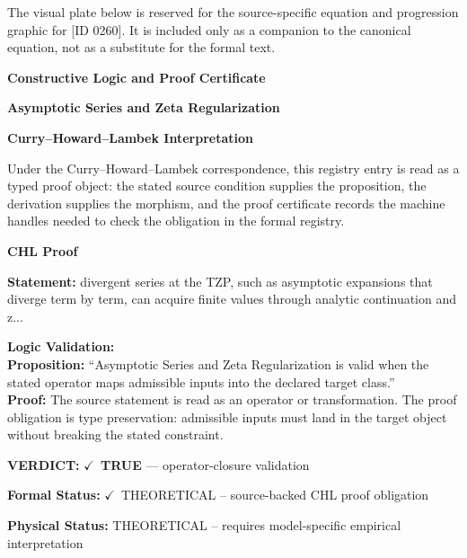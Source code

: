 \begingroup\footnotesize\sloppy
The visual plate below is reserved for the source-specific equation and progression graphic for [ID 0260]. It is included only as a companion to the canonical equation, not as a substitute for the formal text.
\par\endgroup
\ifTZPDarkEdition
{}
\fi

\clearpage
\begingroup\tzpsupportsetup
\noindent\textbf{\fontsize{10.8pt}{12.8pt}\selectfont [ID 0260] Constructive Logic and Proof Certificate}\par
\noindent\textbf{\fontsize{10pt}{12pt}\selectfont Asymptotic Series and Zeta Regularization}\par
\vspace{0.45em}
\begingroup
\footnotesize
\setlength{\parskip}{0.22em}
\setlength{\parindent}{0pt}
\noindent\textbf{Curry--Howard--Lambek Interpretation}\par
Under the Curry--Howard--Lambek correspondence, this registry entry is read as a typed proof
object: the stated source condition supplies the proposition, the derivation supplies the
morphism, and the proof certificate records the machine handles needed to check the obligation
in the formal registry.

\vspace{0.45em}
\noindent\textbf{CHL Proof}\par
\textbf{Statement:} divergent series at the TZP, such as asymptotic expansions that diverge term by term,
can acquire finite values through analytic continuation and z...

\textbf{Logic Validation:}\\
\textbf{Proposition:} ``Asymptotic Series and Zeta Regularization is valid when the stated operator maps
admissible inputs into the declared target class.''\\
\textbf{Proof:} The source statement is read as an operator or transformation. The proof obligation is
type preservation: admissible inputs must land in the target object without breaking the
stated constraint.

\textbf{VERDICT:} \ensuremath{\checkmark}\ \textbf{TRUE} --- operator-closure validation

\textbf{Formal Status:} \ensuremath{\checkmark}\ THEORETICAL -- source-backed CHL proof obligation

\textbf{Physical Status:} THEORETICAL -- requires model-specific empirical interpretation
\par\vspace{0.45em}
\par
\ifTZPDarkEdition
{}
\fi
\endgroup
\endgroup
